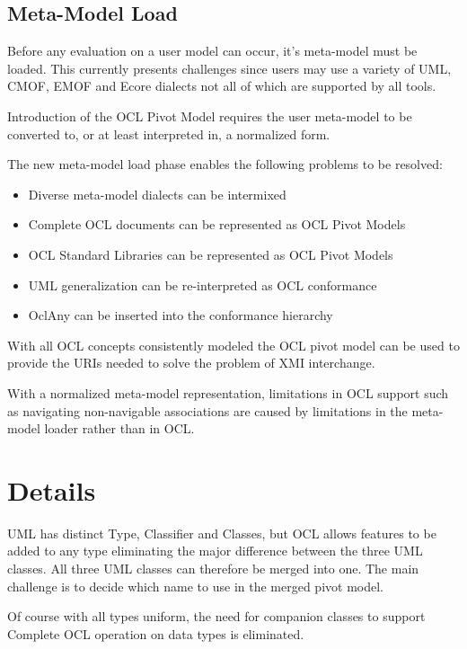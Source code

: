 \documentclass{eceasst}
\begin{document}
\subsection{Meta-Model Load}

Before any evaluation on a user model can occur, it's meta-model must be loaded. This currently presents challenges since users may use a variety of UML, CMOF, EMOF and Ecore dialects not all of which are supported by all tools.

Introduction of the OCL Pivot Model requires the user meta-model to be converted to, or at least interpreted in, a normalized form.

The new meta-model load phase enables the following problems to be resolved:

\begin{itemize}
\item Diverse meta-model dialects can be intermixed
\item Complete OCL documents can be represented as OCL Pivot Models
\item OCL Standard Libraries can be represented as OCL Pivot Models
\item UML generalization can be re-interpreted as OCL conformance
\item OclAny can be inserted into the conformance hierarchy
\end{itemize}

With all OCL concepts consistently modeled the OCL pivot model can be used to provide the URIs needed to solve the problem of XMI interchange.

With a normalized meta-model representation, limitations in OCL support such as navigating non-navigable associations are caused by limitations in the meta-model loader rather than in OCL.

\section{Details}


UML has distinct Type, Classifier and Classes, but OCL allows features to be added to any type eliminating the major difference between the three UML classes. All three UML classes can therefore be merged into one. The main challenge is to decide which name to use in the merged pivot model.

Of course with all types uniform, the need for companion classes to support Complete OCL operation on data types is eliminated.
\end{document}
